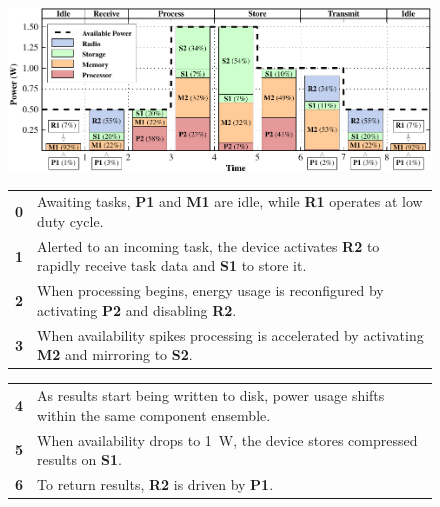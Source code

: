 \begin{figure}[t]
\includegraphics[width=\textwidth]{./figures/transitiongraph.pdf}
\noindent\begin{minipage}[t]{0.5\textwidth}
\vspace{-0.05in}
\begin{tabularx}{\columnwidth}{cX}

\textbf{0} & Awaiting tasks, \textbf{P1} and \textbf{M1} are idle, while
\textbf{R1} operates at low duty cycle.
\\

\textbf{1} & 
Alerted to an incoming task, the device activates \textbf{R2} to rapidly
receive task data and \textbf{S1} to store it.
\\

\textbf{2} &
When processing begins, energy usage is reconfigured by activating
\textbf{P2} and disabling \textbf{R2}.
\\

\textbf{3} &
When availability spikes processing is accelerated by activating \textbf{M2}
and mirroring to \textbf{S2}.
\\

\end{tabularx}

\end{minipage}
\begin{minipage}[t]{0.5\textwidth}
\vspace{-0.05in}

\begin{tabularx}{\columnwidth}{cX}

\textbf{4} &
As results start being written to disk, power usage shifts within the same
component ensemble.
\\

\textbf{5} & 
When availability drops to 1~W, the device stores compressed results on
\textbf{S1}.
\\

\textbf{6} &
To return results, \textbf{R2} is driven by \textbf{P1}.
\\


\end{tabularx}
\end{minipage}
\end{figure}
